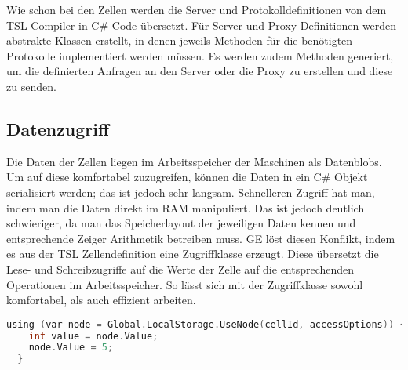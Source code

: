 Wie schon bei den Zellen werden die Server und Protokolldefinitionen von dem TSL Compiler in C\# Code übersetzt. Für Server und Proxy
Definitionen werden abstrakte Klassen erstellt, in denen jeweils Methoden für die benötigten Protokolle implementiert werden müssen.
Es werden zudem Methoden generiert, um die definierten Anfragen an den Server oder die Proxy zu erstellen und diese zu senden.


\subsection{Datenzugriff}

Die Daten der Zellen liegen im Arbeitsspeicher der Maschinen als Datenblobs. Um auf diese komfortabel zuzugreifen, können die Daten in ein C\# Objekt
serialisiert werden; das ist jedoch sehr langsam.
Schnelleren Zugriff hat man, indem man die Daten direkt im RAM manipuliert. Das ist jedoch deutlich schwieriger, da man das Speicherlayout der jeweiligen Daten
kennen und entsprechende Zeiger Arithmetik betreiben muss. GE löst diesen Konflikt, indem es aus der TSL Zellendefinition eine Zugriffklasse erzeugt.
Diese übersetzt die Lese- und Schreibzugriffe auf die Werte der Zelle auf die entsprechenden Operationen im Arbeitsspeicher. So lässt sich mit der Zugriffklasse sowohl
komfortabel, als auch effizient arbeiten.

\begin{lstlisting}[language=c, caption={Bearbeitung einer Zelle mithilfe der Zugriffklasse}]
  using (var node = Global.LocalStorage.UseNode(cellId, accessOptions)) {
    int value = node.Value;
    node.Value = 5;
  }
\end{lstlisting}
